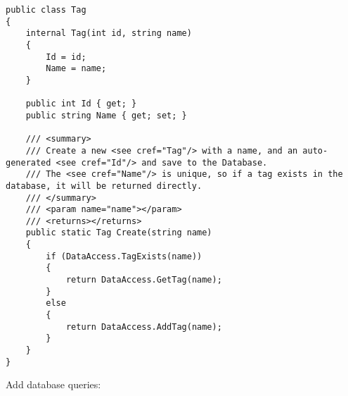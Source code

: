 \documentclass[report.tex]{subfiles}
\begin{document}
\begin{verbatim}
public class Tag
{
    internal Tag(int id, string name)
    {
        Id = id;
        Name = name;
    }

    public int Id { get; }
    public string Name { get; set; }

    /// <summary>
    /// Create a new <see cref="Tag"/> with a name, and an auto-generated <see cref="Id"/> and save to the Database.
    /// The <see cref="Name"/> is unique, so if a tag exists in the database, it will be returned directly.
    /// </summary>
    /// <param name="name"></param>
    /// <returns></returns>
    public static Tag Create(string name)
    {
        if (DataAccess.TagExists(name))
        {
            return DataAccess.GetTag(name);
        }
        else
        {
            return DataAccess.AddTag(name);
        }
    }
}
\end{verbatim}

Add database queries:
\end{document}
